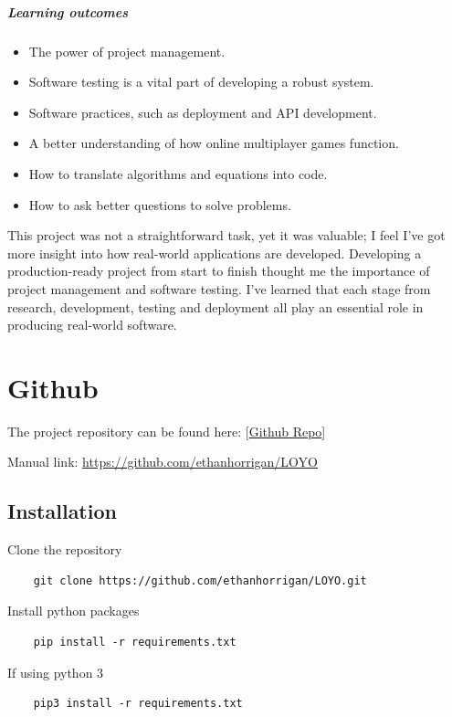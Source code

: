 \paragraph{Learning outcomes}
\begin{itemize}
	\item The power of project management.
	\item Software testing is a vital part of developing a robust system.
	\item Software practices, such as deployment and API development.
	\item A better understanding of how online multiplayer games function.
	\item How to translate algorithms and equations into code.	
	\item How to ask better questions to solve problems.  
\end{itemize}

This project was not a straightforward task, yet it was valuable; I feel I've got more insight into how real-world applications are developed. Developing a production-ready project from start to finish thought me the importance of project management and software testing. I've learned that each stage from research, development, testing and deployment all play an essential role in producing real-world software.

\appendix
\chapter{Github}

The project repository can be found here: [\href{https://github.com/ethanhorrigan/LOYO}{Github Repo}] \hfill \bigbreak
\raggedright Manual link:
\url{https://github.com/ethanhorrigan/LOYO}

\section{Installation}

Clone the repository
\begin{verbatim}
	git clone https://github.com/ethanhorrigan/LOYO.git
\end{verbatim}

Install python packages
\begin{verbatim}
	pip install -r requirements.txt
\end{verbatim}
If using python 3
\begin{verbatim}
	pip3 install -r requirements.txt
\end{verbatim}

